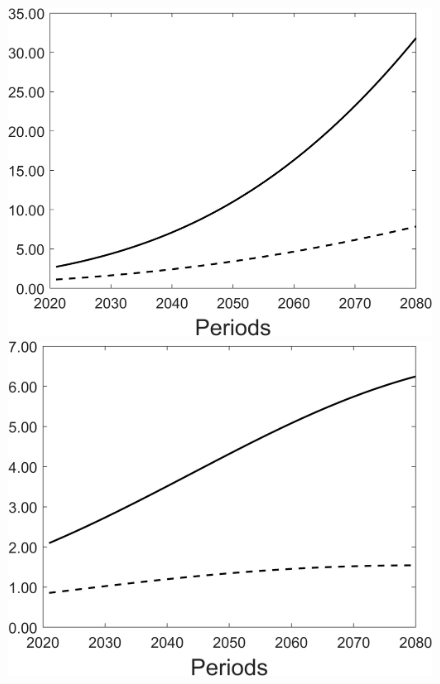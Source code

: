 \begin{figure}[h!!]
\begin{minipage}[]{0.32\textwidth}
	\end{minipage}
	\begin{minipage}[]{0.32\textwidth}
		\includegraphics[width=1\textwidth]{../../codding_model/Own/figures/Rep_agent/staticBAU_LF_separate_xc_periods59_eppsilon0.40_zeta1.40_Ad08_Ac04_thetac0.70_thetad0.56_HetGrowth1_tauul0.181_util0_withtarget0_lgd0.png}
	\end{minipage}
	\begin{minipage}[]{0.32\textwidth}
		\includegraphics[width=1\textwidth]{../../codding_model/Own/figures/Rep_agent/staticBAU_LF_separate_xd_periods59_eppsilon0.40_zeta1.40_Ad08_Ac04_thetac0.70_thetad0.56_HetGrowth1_tauul0.181_util0_withtarget0_lgd0.png}
	\end{minipage}
\end{figure}

